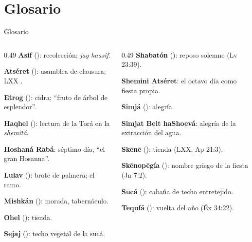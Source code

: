 \section{Glosario}

\begin{frame}{Glosario}
\begin{columns}[t,onlytextwidth]
\begin{column}{0.49\textwidth}\scriptsize
\textbf{Asif} (): recolección; \emph{jag haasif}.\par
\textbf{Atséret} (): asamblea de clausura; LXX .\par
\textbf{Etrog} (): cidra; ``fruto de árbol de esplendor''.\par
\textbf{Haqhel} (): lectura de la Torá en la \emph{shemitá}.\par
\textbf{Hoshaná Rabá}: séptimo día, ``el gran Hosanna''.\par
\textbf{Lulav} (): brote de palmera; el ramo.\par
\textbf{Mishkán} (): morada, tabernáculo.\par
\textbf{Ohel} (): tienda.\par
\textbf{Sejaj} (): techo vegetal de la sucá.
\end{column}
\begin{column}{0.49\textwidth}\scriptsize
\textbf{Shabatón} (): reposo solemne (Lv 23:39).\par
\textbf{Shemini Atséret}: el octavo día como fiesta propia.\par
\textbf{Simjá} (): alegría.\par
\textbf{Simjat Beit haShoevá}: alegría de la extracción del agua.\par
\textbf{Skēnē} (): tienda (LXX; Ap 21:3).\par
\textbf{Skēnopēgía} (): nombre griego de la fiesta (Jn 7:2).\par
\textbf{Sucá} (): cabaña de techo entretejido.\par
\textbf{Tequfá} (): vuelta del año (Éx 34:22).
\end{column}
\end{columns}
\end{frame}

